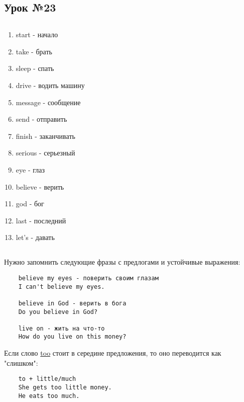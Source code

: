 \subsection{Урок №23}

\subsection*{}
\begin{multicols}{2}
    \begin{enumerate}\setlength{\itemsep}{0pt}
        \item start - начало
        \item take - брать
        \item sleep - спать
        \item drive - водить машину
        \item message - сообщение
        \item send - отправить
        \item finish - заканчивать
        \item serious - серьезный
        \item eye - глаз
        \item believe - верить
        \item god - бог
        \item last - последний
        \item let's - давать
    \end{enumerate}
\end{multicols}

\subsection*{}
Нужно запомнить следующие фразы с предлогами и устойчивые выражения:
\begin{verbatim}
    believe my eyes - поверить своим глазам
    I can't believe my eyes.

    believe in God - верить в бога
    Do you believe in God?

    live on - жить на что-то
    How do you live on this money?
\end{verbatim}

Если слово \underline{too} стоит в середине предложения, то оно переводится как "слишком":
\begin{verbatim}
    to + little/much
    She gets too little money.
    He eats too much.
\end{verbatim}